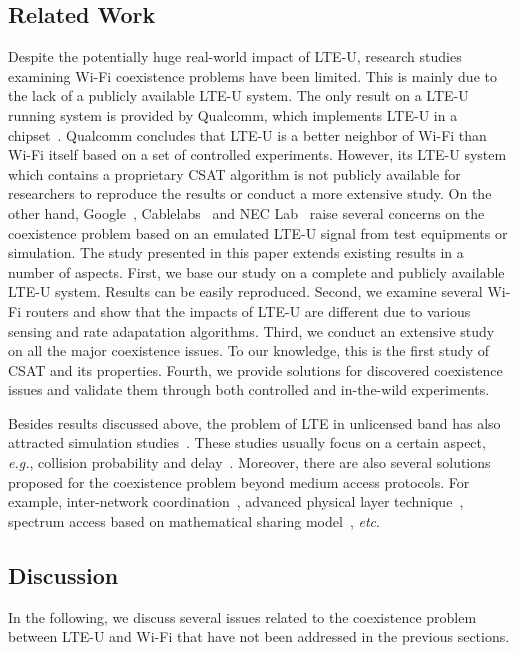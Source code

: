 \subsection{Related Work}

Despite the potentially huge real-world impact of LTE-U,
research studies examining Wi-Fi coexistence problems have been 
limited. This is mainly due to the lack of a publicly available LTE-U system.
The only result on a LTE-U running system is provided by Qualcomm,
which implements LTE-U in a chipset~\cite{qualcommpresentation,qualcommiccw}.
Qualcomm concludes that LTE-U is a better neighbor of Wi-Fi than Wi-Fi itself based on a set of controlled experiments.
However, its LTE-U system which contains a proprietary CSAT algorithm is not publicly available for researchers to reproduce the results or conduct a more extensive study.
On the other hand, Google~\cite{google}, Cablelabs~\cite{cablelabs} and NEC Lab~\cite{chai2016lte} raise several concerns on the coexistence problem 
based on an emulated LTE-U signal from test equipments or simulation.
The study presented in this paper extends existing results in a number of aspects.
First, we base our study on a complete and publicly available LTE-U system.
Results can be easily reproduced.
Second, we examine several Wi-Fi routers and show that the impacts of LTE-U
are different due to various sensing and rate adapatation algorithms. 
Third, we conduct an extensive study on all the major coexistence issues.
To our knowledge, this is the first study of CSAT and its properties. 
Fourth, we provide solutions for discovered coexistence issues and validate 
them through both controlled and in-the-wild experiments.

Besides results discussed above,
the problem of LTE in unlicensed band has also attracted simulation studies~\cite{simulation1,simulation2,simulation3}.
These studies usually focus on a certain aspect,
\textit{e.g.}, collision probability and delay~\cite{simulation1}.
Moreover, there are also several solutions proposed for the coexistence problem beyond medium access protocols.
For example,
inter-network coordination~\cite{solution2},
advanced physical layer technique~\cite{solution3},
spectrum access based on mathematical sharing model~\cite{solution1},
\textit{etc}.

\subsection{Discussion}

In the following, we discuss several 
issues related to the coexistence problem between LTE-U and Wi-Fi that have not been addressed in the previous sections. 

